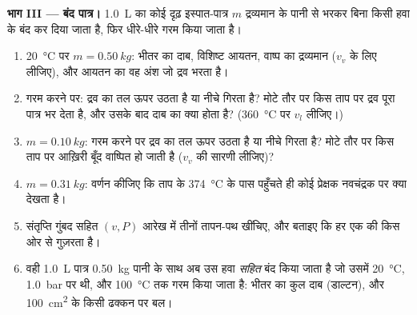 \begin{problem}
\medskip
\noindent\textbf{भाग III --- बंद पात्र।}
\qty{1.0}{L} का कोई दृढ़ इस्पात-पात्र $m$ द्रव्यमान के पानी से भरकर बिना
किसी हवा के बंद कर दिया जाता है, फिर धीरे-धीरे गरम किया जाता है।
\begin{enumerate}[resume]
  \item \qty{20}{\degreeCelsius} पर $m = \qty{0.50}{kg}$: भीतर का दाब,
        विशिष्ट आयतन, वाष्प का द्रव्यमान ($v_v$ के लिए  लीजिए),
        और आयतन का वह अंश जो द्रव भरता है।
  \item गरम करने पर: द्रव का तल ऊपर उठता है या नीचे गिरता है? मोटे तौर पर
        किस ताप पर द्रव पूरा पात्र भर देता है, और उसके बाद दाब का क्या
        होता है? (\qty{360}{\degreeCelsius} पर $v_l$ लीजिए।)
  \item $m = \qty{0.10}{kg}$: गरम करने पर द्रव का तल ऊपर उठता है या नीचे
        गिरता है? मोटे तौर पर किस ताप पर आख़िरी बूँद वाष्पित हो जाती है
        ($v_v$ की सारणी लीजिए)?
  \item $m = \qty{0.31}{kg}$: वर्णन कीजिए कि ताप के \qty{374}{\degreeCelsius}
        के पास पहुँचते ही कोई प्रेक्षक नवचंद्रक पर क्या देखता है।
  \item संतृप्ति गुंबद सहित $(v, P)$ आरेख में तीनों तापन-पथ खींचिए, और
        बताइए कि हर एक  की किस ओर से गुज़रता है।
  \item वही \qty{1.0}{L} पात्र \qty{0.50}{kg} पानी के साथ अब उस हवा
        \emph{सहित} बंद किया जाता है जो उसमें \qty{20}{\degreeCelsius},
        \qty{1.0}{bar} पर थी, और \qty{100}{\degreeCelsius} तक गरम किया जाता
        है: भीतर का कुल दाब (डाल्टन), और \qty{100}{cm^2} के किसी ढक्कन पर बल।
\end{enumerate}


\end{problem}
